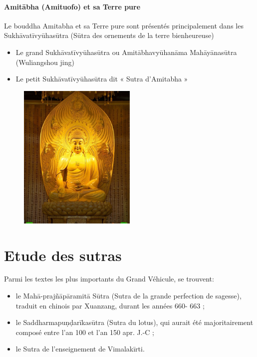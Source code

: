 \paragraph{Amitābha (Amituofo) et sa Terre pure}

Le bouddha Amitabha et sa Terre pure sont présentés principalement dans les Sukhāvatīvyūhasūtra (Sūtra des ornements de la terre bienheureuse)
\begin{itemize}
    \item Le grand Sukhāvatīvyūhasūtra ou Amitābhavyūhanāma Mahāyānasūtra (Wuliangshou jing)
    \item 	Le petit Sukhāvatīvyūhasūtra dit « Sutra d’Amitabha »
\end{itemize}
 

\begin{figure}
    \centering
    \includegraphics[width=0.5\textwidth]{ConfucianismeTaoismeBouddhismeChinois/Images/BouddhaAmituofo.jpg}

    \label{fig:enter-label}
\end{figure}

\section{Etude des sutras}

Parmi les textes les plus importants du Grand Véhicule, se trouvent:
\begin{itemize}
    \item  le Mahā-prajñāpāramitā Sūtra (Sutra de la grande perfection de sagesse), traduit en chinois par Xuanzang, durant les années 660- 663 ;
   \item  le Saddharmapuṇḍarīkasūtra (Sutra du lotus), qui aurait été majoritairement composé entre l’an 100 et l’an 150 apr. J.-C ;
   \item  le Sutra de l’enseignement de Vimalakīrti.
\end{itemize}

